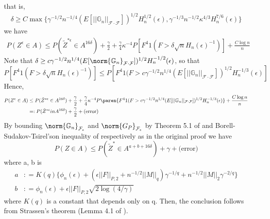 \documentclass[uplatex,dvipdfmx]{jsarticle}
\begin{document}
 that is, 
\begin{align*}
    \delta \geq C \max \{ \gamma^{-1/2}n ^{-1/4} ( E[ ||\mathbb{G}_n|| _ {\mathcal{F}\cdot \mathcal{F}}])^{1/2} H_n^{1/2}  (\epsilon) , \gamma^{-1/3} n^{-1/2} \kappa^{4/3} H_n ^{7/6} ( \epsilon) \}
\end{align*} 
we have 
\begin{align*}
    P(Z^\epsilon \in A) \leq P( \tilde{Z}^{ * \epsilon} \in A^{16 \delta}) + \frac{\gamma}{2} + \frac{\gamma}{4} \kappa^{-4} P[ F^4 1 ( F > \delta \sqrt{n} H_n ( \epsilon)^{-1}) ] + \frac{C \log n }{n} 
\end{align*}
Note that $ \delta \geq c \gamma^{-1/2}n ^{1/4} ( E[ \norm{\mathbb{G}_n} _ {\mathcal{F}\cdot \mathcal{F}}])^{1/2} H_n^{-1/2}  (\epsilon) $, so that 
\begin{equation*}
    P[ F^4 1(F > \delta \sqrt{n} H_n (\epsilon)^{-1})] \leq P[ F^4 1( F > c \gamma^{-1/2} n^{1/4} ( E[ || \mathbb{G}_n||_{\mathcal{F} \cdot \mathcal{F}}])^{1/2} H_n^{- 1/3}(\epsilon) ]
\end{equation*}
Hence,
\begin{align*}
    P(Z^\epsilon \in A) &\leq P( \tilde{Z}^{ * \epsilon} \in A^{16 \delta}) + \frac{\gamma}{2} + \frac{\gamma}{4} \kappa^{-4}  P\paren{ F^4 1( F > c \gamma^{-1/2} n^{1/4} ( E[ || \mathbb{G}_n||_{\mathcal{F} \cdot \mathcal{F}}])^{1/2} H_n^{- 1/3}(\epsilon)} + \frac{C \log n }{n} \\
    &=: P( \tilde{Z}^{* \epsilon} in A^{16 \delta}) + \frac{\gamma}{2} + \text{(error)} 
\end{align*}
By bounding $\norm{\mathbb{G}_n}_{\mathcal{F}_\epsilon} $ and $ \norm{G_P}_{\mathcal{F}_\epsilon}$ by Theorem 5.1 of \cite{chernozhukov2014gaussian} and Borell-Sudakov-Tsirel'son inequality of \cite{van1998empirical} respectively as in the original proof we have
\begin{equation*}
    P(Z \in A) \leq P( \tilde{Z}^{*} \in A^{a + b + 16 \delta}) + \gamma + \text{(error)} 
\end{equation*}
where a, b is 
\begin{align*}
    a&: = K(q) \{ \phi_n ( \epsilon) + ( \epsilon ||F||_{P,2} + n^{-1/2} || M||_q ) \gamma^{-1/q} + n^{-1/2} || M|| _2 \gamma^{-2/q} \} \\
    b&: = \phi_n (\epsilon) + \epsilon || F||_{P,2} \sqrt{ 2 \log( 4/ \gamma)}
\end{align*}
where $K(q)$ is a constant that depends only on q. 
Then, the conclusion follows from Strassen's theorem (Lemma 4.1 of \cite{chernozhukov2014gaussian}).
\end{document}
